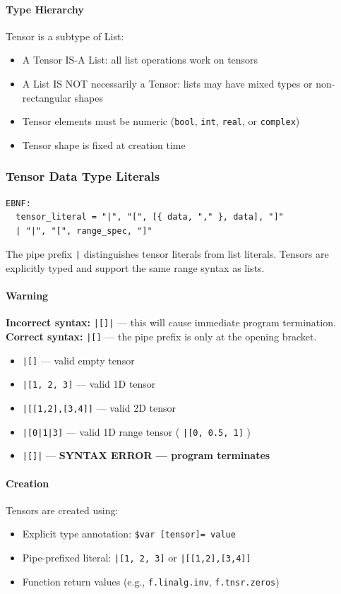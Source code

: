\paragraph{Type Hierarchy}
Tensor is a subtype of List:
\begin{itemize}
\item A Tensor IS-A List: all list operations work on tensors
\item A List IS NOT necessarily a Tensor: lists may have mixed types or non-rectangular shapes
\item Tensor elements must be numeric (\texttt{bool}, \texttt{int}, \texttt{real}, or \texttt{complex})
\item Tensor shape is fixed at creation time
\end{itemize}

\subsubsection{Tensor Data Type Literals}
\begin{verbatim}
EBNF:
  tensor_literal = "|", "[", [{ data, "," }, data], "]"
  | "|", "[", range_spec, "]"
  \end{verbatim}
  The pipe prefix \texttt{|} distinguishes tensor literals from list literals. Tensors are explicitly typed and support the same range syntax as lists.

  \paragraph{Warning}
  \textbf{Incorrect syntax:} \texttt{|[]|} --- this will cause immediate program termination.
  \textbf{Correct syntax:} \texttt{|[]} --- the pipe prefix is only at the opening bracket.
  \begin{itemize}
  \item \texttt{|[]} --- valid empty tensor
  \item \texttt{|[1, 2, 3]} --- valid 1D tensor
  \item \texttt{|[[1,2],[3,4]]} --- valid 2D tensor
  \item \texttt{|[0|1|3]} --- valid 1D range tensor ( \texttt{|[0, 0.5, 1]} )
  \item \texttt{|[]|} --- \textbf{SYNTAX ERROR --- program terminates}
  \end{itemize}

\paragraph{Creation}
Tensors are created using:
\begin{itemize}
\item Explicit type annotation: \texttt{\$var [tensor]= value}
\item Pipe-prefixed literal: \texttt{|[1, 2, 3]} or \texttt{|[[1,2],[3,4]]}
\item Function return values (e.g., \texttt{f.linalg.inv}, \texttt{f.tnsr.zeros})
\end{itemize}

